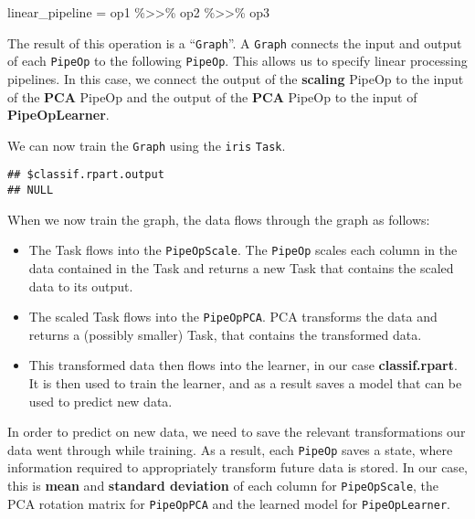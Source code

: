 \documentclass[
]{scrbook}
\newenvironment{Shaded}{\begin{snugshade}}{\end{snugshade}}
\newcommand{\FunctionTok}[1]{\textcolor[rgb]{0.00,0.00,0.00}{#1}}
\newcommand{\NormalTok}[1]{#1}
\newcommand{\OtherTok}[1]{\textcolor[rgb]{0.56,0.35,0.01}{#1}}
\newcommand{\SpecialCharTok}[1]{\textcolor[rgb]{0.00,0.00,0.00}{#1}}
\providecommand{\tightlist}{%
  \setlength{\itemsep}{0pt}\setlength{\parskip}{0pt}}
\renewenvironment{Shaded} {\begin{snugshade}\small} {\end{snugshade}}
\begin{document}
\begin{Shaded}
\begin{Highlighting}[]
\NormalTok{linear\_pipeline }\OtherTok{=}\NormalTok{ op1 }\SpecialCharTok{\%\textgreater{}\textgreater{}\%}\NormalTok{ op2 }\SpecialCharTok{\%\textgreater{}\textgreater{}\%}\NormalTok{ op3}
\end{Highlighting}
\end{Shaded}

The result of this operation is a ``\texttt{Graph}''.
A \texttt{Graph} connects the input and output of each \texttt{PipeOp} to the following \texttt{PipeOp}.
This allows us to specify linear processing pipelines.
In this case, we connect the output of the \textbf{scaling} PipeOp to the input of the \textbf{PCA} PipeOp and the output of the \textbf{PCA} PipeOp to the input of \textbf{PipeOpLearner}.

We can now train the \texttt{Graph} using the \texttt{iris} \texttt{Task}.

\begin{Shaded}
\end{Shaded}

\begin{verbatim}
## $classif.rpart.output
## NULL
\end{verbatim}

When we now train the graph, the data flows through the graph as follows:

\begin{itemize}
\tightlist
\item
  The Task flows into the \texttt{PipeOpScale}.
  The \texttt{PipeOp} scales each column in the data contained in the Task and returns a new Task that contains the scaled data to its output.
\item
  The scaled Task flows into the \texttt{PipeOpPCA}.
  PCA transforms the data and returns a (possibly smaller) Task, that contains the transformed data.
\item
  This transformed data then flows into the learner, in our case \textbf{classif.rpart}.
  It is then used to train the learner, and as a result saves a model that can be used to predict new data.
\end{itemize}

In order to predict on new data, we need to save the relevant transformations our data went through while training.
As a result, each \texttt{PipeOp} saves a state, where information required to appropriately transform future data is stored.
In our case, this is \textbf{mean} and \textbf{standard deviation} of each column for \texttt{PipeOpScale}, the PCA rotation matrix for \texttt{PipeOpPCA} and the learned model for \texttt{PipeOpLearner}.
\end{document}
